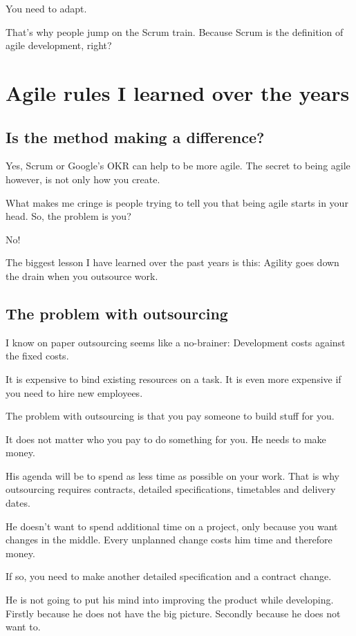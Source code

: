 \documentclass[12pt, numbers=noenddot]{scrreprt} %
\begin{document}
You need to adapt.

That’s why people jump on the Scrum train. Because Scrum is the definition of agile development, right?

\section{Agile rules I learned over the years}

\subsection{Is the method making a difference?}
Yes, Scrum or Google’s OKR can help to be more agile. The secret to being agile however, is not only how you create.

What makes me cringe is people trying to tell you that being agile starts in your head. So, the problem is you?

No!

The biggest lesson I have learned over the past years is this: Agility goes down the drain when you outsource work.

\subsection{The problem with outsourcing}
I know on paper outsourcing seems like a no-brainer: Development costs against the fixed costs.

It is expensive to bind existing resources on a task. It is even more expensive if you need to hire new employees.

The problem with outsourcing is that you pay someone to build stuff for you.

It does not matter who you pay to do something for you. He needs to make money.

His agenda will be to spend as less time as possible on your work. That is why outsourcing requires contracts, detailed specifications, timetables and delivery dates.

He doesn’t want to spend additional time on a project, only because you want changes in the middle. Every unplanned change costs him time and therefore money.

If so, you need to make another detailed specification and a contract change.

He is not going to put his mind into improving the product while developing. Firstly because he does not have the big picture. Secondly because he does not want to.
\end{document}
